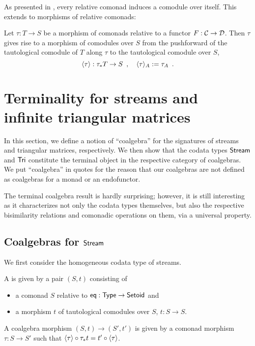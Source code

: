 \documentclass[envcountsame]{llncs}
\begin{document}
As presented in , every relative comonad induces a comodule over itself.
This extends to morphisms of relative comonads:

\begin{definition}%
\label{def:induced} 
  Let $\tau : T\to S$ be a morphism of comonads relative to a functor $F : {\mathcal{C}} \to \mathcal{D}$.
  Then $\tau$ gives rise to a morphism of comodules over $S$ from the pushforward of the tautological comodule
  of $T$ along $\tau$ to the tautological comodule over $S$,
  \[ \langle {\tau} \rangle : \tau_*T \to S \enspace , \quad \langle {\tau} \rangle_A := \tau_A \enspace . \]
\end{definition}




\section{Terminality for streams and infinite triangular matrices}\label{sec:coalgebras_for_tri}

In this section, we define a notion of \enquote{coalgebra} for the signatures of streams and triangular matrices,
respectively. We then show that the codata types $\mathsf{Stream}$ and $\mathsf{Tri}$ constitute the terminal object in
the respective category of coalgebras.
We put \enquote{coalgebra} in quotes for the reason that our coalgebras are not defined as coalgebras for a monad or an endofunctor.

The terminal coalgebra result is hardly surprising; however, it is still interesting as it characterizes not only the codata types themselves,
 but also the respective bisimilarity relations and comonadic operations on them, via a universal property.
 


\begin{Long}
\subsection{Coalgebras for $\mathsf{Stream}$}

We first consider the homogeneous codata type of streams.
\end{Long}

\begin{definition}%
 \label{cat_stream}
  A  is given by a pair $(S,t)$ 
  consisting of
  \begin{itemize}
   \item a comonad $S$ relative to $\mathsf{eq} : \mathsf{Type} \to \mathsf{Setoid}$ and
   \item a morphism $t$ of tautological comodules over $S$, $t : S \to S$.
  \end{itemize}
  A coalgebra morphism $(S,t) \to (S',t')$ is given by a comonad morphism $\tau : S \to S'$ such that
     $ {\langle {\tau} \rangle} \circ {\tau_*t} = {t'} \circ {\ensuremath{\langle {\tau} \rangle}}$.
\end{definition}
\end{document}
